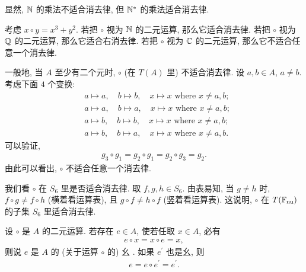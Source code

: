 \begin{example}
    显然, $\mathbb{N}$ 的乘法不适合消去律, 但 $\mathbb{N}^{\ast}$ 的乘法适合消去律.
\end{example}

\begin{example}
    考虑 $x \circ y = x^3 + y^2$. 若把 $\circ$ 视为 $\mathbb{N}$ 的二元运算, 那么它适合消去律. 若把 $\circ$ 视为 $\mathbb{Q}$ 的二元运算, 那么它适合右消去律. 若把 $\circ$ 视为 $\mathbb{C}$ 的二元运算, 那么它不适合任意一个消去律.
\end{example}

\begin{example}
    一般地, 当 $A$ 至少有二个元时, $\circ$ (在 $T(A)$ 里) 不适合消去律. 设 $a,b \in A$, $a \neq b$. 考虑下面 $4$ 个变换:
    \begin{align*}
         & a \mapsto a, \quad b \mapsto b, \quad x \mapsto x \text{ where $x \neq a,b$}; \tag*{$g_0 \colon$} \\
         & a \mapsto a, \quad b \mapsto a, \quad x \mapsto x \text{ where $x \neq a,b$}; \tag*{$g_1 \colon$} \\
         & a \mapsto b, \quad b \mapsto b, \quad x \mapsto x \text{ where $x \neq a,b$}; \tag*{$g_2 \colon$} \\
         & a \mapsto b, \quad b \mapsto a, \quad x \mapsto x \text{ where $x \neq a,b$}. \tag*{$g_3 \colon$}
    \end{align*}
    可以验证,
    \begin{align*}
        g_3 \circ g_1 = g_2 \circ g_1 = g_2 \circ g_3 = g_2.
    \end{align*}
    由此可以看出, $\circ$ 不适合任意一个消去律.
\end{example}

\begin{example}
    我们看 $\circ$ 在 $S_6$ 里是否适合消去律. 取 $f,g,h \in S_6$. 由表易知, 当 $g \neq h$ 时, $f \circ g \neq f \circ h$ (横着看运算表), 且 $g \circ f \neq h \circ f$ (竖着看运算表). 这说明, $\circ$ 在 $T(\mathbb{F}_{\mathrm{nu}})$ 的子集 $S_6$ 里适合消去律.
\end{example}

\begin{definition}
    设 $\circ$ 是 $A$ 的二元运算. 若存在 $e \in A$, 使若任取 $x \in A$, 必有
    \begin{align*}
        e \circ x = x \circ e = x,
    \end{align*}
    则说 $e$ 是 $A$ 的 (关于运算 $\circ$ 的) 幺 . 如果 $e^{\prime}$ 也是幺, 则
    \begin{align*}
        e = e \circ e^{\prime} = e^{\prime}.
    \end{align*}
\end{definition}

